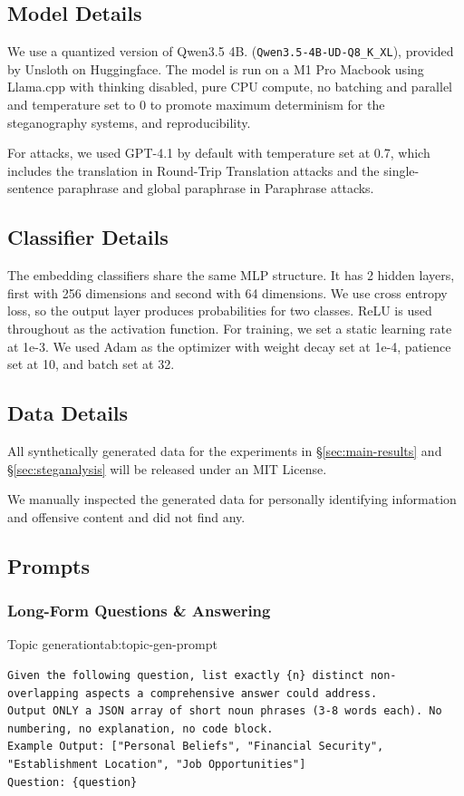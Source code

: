 \subsection{Model Details}
We use a quantized version of Qwen3.5 4B. (\texttt{Qwen3.5-4B-UD-Q8\_K\_XL}), provided by Unsloth on Huggingface. The model is run on a M1 Pro Macbook using Llama.cpp with thinking disabled, pure CPU compute, no batching and parallel and temperature set to 0 to promote maximum determinism for the steganography systems, and reproducibility.

For attacks, we used GPT-4.1 by default with temperature set at 0.7, which includes the translation in Round-Trip Translation attacks and the single-sentence paraphrase and global paraphrase in Paraphrase attacks.

\subsection{Classifier Details}
The embedding classifiers share the same MLP structure. It has 2 hidden layers, first with 256 dimensions and second with 64 dimensions. We use cross entropy loss, so the output layer produces probabilities for two classes. ReLU \cite{nair2010rectified} is used throughout as the activation function. For training, we set a static learning rate at 1e-3. We used Adam \cite{kingma2017adammethodstochasticoptimization} as the optimizer with weight decay set at 1e-4, patience set at 10, and batch set at 32.

\subsection{Data Details}
All synthetically generated data for the experiments in \S\ref{sec:main-results} and \S\ref{sec:steganalysis} will be released under an MIT License.

We manually inspected the generated data for personally identifying information and offensive content and did not find any.

\subsection{Prompts}

\subsubsection{Long-Form Questions \& Answering}

\begin{prompttable}{Topic generation}{tab:topic-gen-prompt}
\begin{lstlisting}[style=promptstyle]
Given the following question, list exactly {n} distinct non-overlapping aspects a comprehensive answer could address.
Output ONLY a JSON array of short noun phrases (3-8 words each). No numbering, no explanation, no code block.
Example Output: ["Personal Beliefs", "Financial Security", "Establishment Location", "Job Opportunities"]
Question: {question}
\end{lstlisting}
\end{prompttable}

